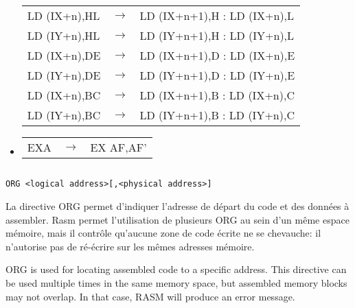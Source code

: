 \begin{itemize}
\begin{tabular}{lll}
LD (IX+n),HL & $\rightarrow$ & LD (IX+n+1),H : LD (IX+n),L \\
LD (IY+n),HL & $\rightarrow$ & LD (IY+n+1),H : LD (IY+n),L \\
LD (IX+n),DE & $\rightarrow$ & LD (IX+n+1),D : LD (IX+n),E \\
LD (IY+n),DE & $\rightarrow$ & LD (IY+n+1),D : LD (IY+n),E \\
LD (IX+n),BC & $\rightarrow$ & LD (IX+n+1),B : LD (IX+n),C \\
LD (IY+n),BC & $\rightarrow$ & LD (IY+n+1),B : LD (IY+n),C \\
\end{tabular}

\item {}

\begin{tabular}{lll}
EXA & $\rightarrow$ & EX AF,AF' \\
\end{tabular}

\end{itemize}



\subsection{}

\subsubsection{}

\begin{verbatim}
ORG <logical address>[,<physical address>]
\end{verbatim}

\begin{xfr}
La directive ORG permet d'indiquer l'adresse de départ du code et des données à assembler.
  Rasm permet l'utilisation de plusieurs ORG au sein d'un même espace mémoire, mais il contrôle qu'aucune zone de code écrite ne se chevauche: il n'autorise pas de ré-écrire sur les mêmes adresses mémoire.
\end{xfr}

\begin{xen}
ORG is used for locating assembled code to a specific address.
This directive can be used multiple times in the same memory space, but assembled memory blocks may not overlap.
In that case, RASM will produce an error message.
\end{xen}

